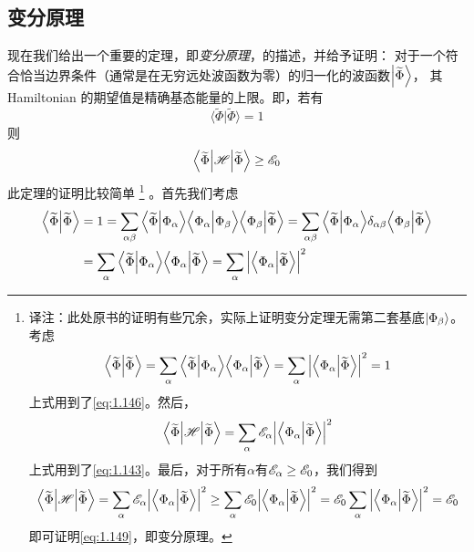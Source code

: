 \subsection{变分原理}
\label{sec:1.3.1}
现在我们给出一个重要的定理，即\emph{变分原理}，的描述，并给予证明：
对于一个符合恰当边界条件（通常是在无穷远处波函数为零）的归一化的波函数$\Ket{\widetilde\Phi}$，
其 Hamiltonian 的期望值是精确基态能量的上限。即，若有
\begin{equation}
 \Big\langle\widetilde\Phi\Big\vert\widetilde\Phi\Big\rangle = 1
 \label{eq:1.148}
\end{equation}
则
\begin{equation}
 \Big\langle\widetilde\Phi\Big\vert\mathscr{H}\Big\vert\widetilde\Phi\Big\rangle \geq \mathscr{E}_0
 \label{eq:1.149}
\end{equation}
此定理的证明比较简单
\footnote{
译注：此处原书的证明有些冗余，实际上证明变分定理无需第二套基底$\Ket{\Phi_\beta}$。考虑
\[
    \left\langle \widetilde\Phi \middle\vert \widetilde\Phi \right\rangle = \sum_\alpha \Big\langle\widetilde\Phi\Big\vert\Phi_\alpha\Big\rangle\Big\langle\Phi_\alpha\Big\vert\widetilde\Phi\Big\rangle = \sum_\alpha \Big\vert\Big\langle\Phi_\alpha\Big\vert\widetilde\Phi\Big\rangle\Big\vert^2 = 1
\]
上式用到了\autoref{eq:1.146}。然后，
\[
    \Big\langle\widetilde\Phi\Big\vert\mathscr{H}\Big\vert\widetilde\Phi\Big\rangle =  \sum_\alpha \mathscr{E}_\alpha \Big\vert\Big\langle\Phi_\alpha\Big\vert\widetilde\Phi\Big\rangle\Big\vert^2
\]
上式用到了\autoref{eq:1.143}。最后，对于所有$\alpha$有$\mathscr{E}_\alpha \geq \mathscr{E}_0$，我们得到
\[
    \Big\langle\widetilde\Phi\Big\vert\mathscr{H}\Big\vert\widetilde\Phi\Big\rangle = \sum_\alpha \mathscr{E}_\alpha\Big\vert\Big\langle\Phi_\alpha\Big\vert\widetilde\Phi\Big\rangle\Big\vert^2 \geq \sum_\alpha \mathscr{E}_0\Big\vert\Big\langle\Phi_\alpha\Big\vert\widetilde\Phi\Big\rangle\Big\vert^2 = \mathscr{E}_0\sum_\alpha \Big\vert\Big\langle\Phi_\alpha\Big\vert\widetilde\Phi\Big\rangle\Big\vert^2 = \mathscr{E}_0
\]
即可证明\autoref{eq:1.149}，即变分原理。
}
。首先我们考虑
\begin{equation}
 \begin{split}
     \left\langle \widetilde\Phi \middle\vert \widetilde\Phi \right\rangle &= 1 = \sum_{\alpha\beta}\Big\langle\widetilde\Phi\Big\vert\Phi_\alpha\Big\rangle\Big\langle\Phi_\alpha\Big\vert\Phi_\beta\Big\rangle\Big\langle\Phi_\beta\Big\vert\widetilde\Phi\Big\rangle = \sum_{\alpha\beta} \Big\langle\widetilde\Phi\Big\vert\Phi_\alpha\Big\rangle\delta_{\alpha\beta}\Big\langle\Phi_\beta\Big\vert\widetilde\Phi\Big\rangle \\
     &= \sum_\alpha \Big\langle\widetilde\Phi\Big\vert\Phi_\alpha\Big\rangle\Big\langle\Phi_\alpha\Big\vert\widetilde\Phi\Big\rangle = \sum_\alpha \Big\vert\Big\langle\Phi_\alpha\Big\vert\widetilde\Phi\Big\rangle\Big\vert^2
 \end{split}
 \label{eq:1.150}
\end{equation}
